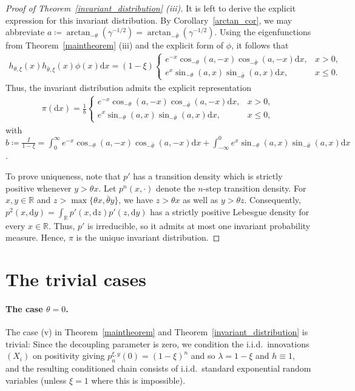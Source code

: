 \documentclass[10pt,a4paper]{amsart}
\newcommand{\R}{\mathbb{R}} %
\newcommand{\1}{\mathds{1}}
\renewcommand{\d}{\mathrm{d}}
\begin{document}
\begin{proof}[Proof of Theorem~\ref{invariant_distribution} (iii)]
It is left to derive the explicit expression for this invariant distribution. By Corollary~\ref{arctan_cor}, we may abbreviate $a\coloneqq \arctan_{ -\theta}(\gamma^{-1/2})=\arctan_{-\bar\theta}(\gamma^{-1/2})$. Using the eigenfunctions from Theorem~\ref{maintheorem} (iii) and the explicit form of $\phi$,
it follows that 
\begin{align*}
    h_{\theta,\xi}(x) h_{\bar\theta,\xi}(x) \phi(x)\d x = (1-\xi) \begin{cases} e^{-x} \cos_{-\theta}(a,-x) \cos_{-\bar \theta}(a,-x)\d x, &x>0,\\ e^x \sin_{-\theta}(a,x) \sin_{-\bar \theta}(a,x)\d x, &x\leq0. \end{cases}
\end{align*}
Thus, the invariant distribution admits the explicit representation 
\begin{align*}
    \pi(\d x) = \frac{1}{b} 
    \begin{cases} e^{-x} \cos_{-\theta}(a,-x) \cos_{-\bar \theta}(a,-x)\d x, &x>0,\\ e^x \sin_{-\theta}(a,x) \sin_{-\bar \theta}(a,x)\d x, &x\leq0, \end{cases}
\end{align*}
with $b\coloneqq\frac{I}{1-\xi}= \int_0^\infty e^{-x} \cos_{-\theta}(a,-x) \cos_{-\bar \theta}(a,-x)\d x + \int_{-\infty}^0 e^x \sin_{-\theta}(a,x) \sin_{-\bar \theta}(a,x)\d x$.

To prove uniqueness, note that $p'$ has a transition density which is strictly positive whenever $y>\theta x$. Let $p^n(x,\cdot)$ denote the $n$-step transition density. For $x,y\in\R$ and $z>\max\{\theta x,\bar\theta y\}$, we have $z>\theta x$ as well as $y>\theta z$. Consequently, $p^2(x,\d y)=\int_{\R}p'(x,\d z)p'(z,\d y)$ has a strictly positive Lebesgue density for every $x\in\R$. Thus, $p'$ is irreducible, so it admits at most one invariant probability measure. Hence, $\pi$ is the unique invariant distribution.
\end{proof}

\section{The trivial cases}\label{trivialcases}
\paragraph{The case \texorpdfstring{$\theta=0$}{theta =0}.}
The case (v) in Theorem~\ref{maintheorem} and Theorem~\ref{invariant_distribution} is trivial: Since the decoupling parameter is zero, we condition the i.i.d.\ innovations $(X_i)$ on positivity giving $p_n^{\xi,y}(0)=(1-\xi)^n$ and so $\lambda=1-\xi$ and $h\equiv 1$, and the resulting conditioned chain consists of i.i.d.\ standard exponential random variables (unless $\xi=1$ where this is impossible).
\end{document}
